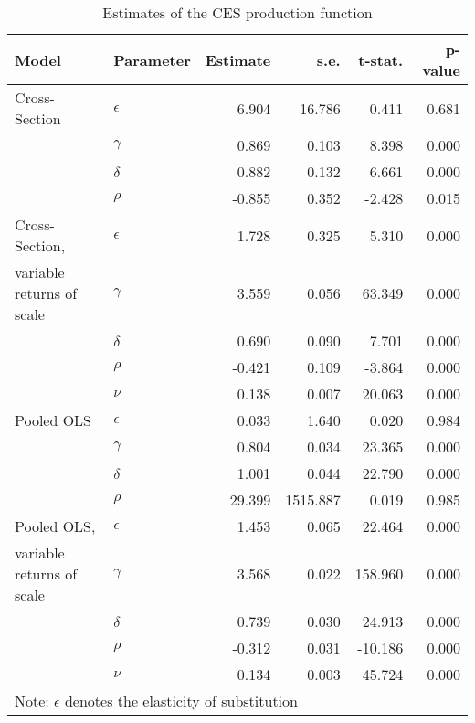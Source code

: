 \documentclass[12pt,a4paper]{article}\usepackage[]{graphicx}\usepackage[]{color}
\begin{document}
\begin{table}[ht]
\centering
\begin{tabular}{llrrrr}
  \toprule
Model & Parameter & Estimate & s.e. & t-stat. & p-value \\ 
  \midrule
Cross-Section & $\epsilon$ & 6.904 & 16.786 & 0.411 & 0.681 \\ 
   & $\gamma$ & 0.869 & 0.103 & 8.398 & 0.000 \\ 
   & $\delta$ & 0.882 & 0.132 & 6.661 & 0.000 \\ 
   & $\rho$ & -0.855 & 0.352 & -2.428 & 0.015 \\ 
   \midrule
Cross-Section, & $\epsilon$ & 1.728 & 0.325 & 5.310 & 0.000 \\ 
  variable returns of scale & $\gamma$ & 3.559 & 0.056 & 63.349 & 0.000 \\ 
   & $\delta$ & 0.690 & 0.090 & 7.701 & 0.000 \\ 
   & $\rho$ & -0.421 & 0.109 & -3.864 & 0.000 \\ 
   & $\nu$ & 0.138 & 0.007 & 20.063 & 0.000 \\ 
   \midrule
Pooled OLS & $\epsilon$ & 0.033 & 1.640 & 0.020 & 0.984 \\ 
   & $\gamma$ & 0.804 & 0.034 & 23.365 & 0.000 \\ 
   & $\delta$ & 1.001 & 0.044 & 22.790 & 0.000 \\ 
   & $\rho$ & 29.399 & 1515.887 & 0.019 & 0.985 \\ 
   \midrule
Pooled OLS, & $\epsilon$ & 1.453 & 0.065 & 22.464 & 0.000 \\ 
  variable returns of scale & $\gamma$ & 3.568 & 0.022 & 158.960 & 0.000 \\ 
   & $\delta$ & 0.739 & 0.030 & 24.913 & 0.000 \\ 
   & $\rho$ & -0.312 & 0.031 & -10.186 & 0.000 \\ 
   & $\nu$ & 0.134 & 0.003 & 45.724 & 0.000 \\ 
   \midrule 
 \multicolumn{5}{l}{\footnotesize{Note: $\epsilon$ denotes the elasticity of substitution}} \\ 
 \bottomrule
\end{tabular}
\caption{Estimates of the CES production function} 
\label{tab:ces}
\end{table}
\end{document}
